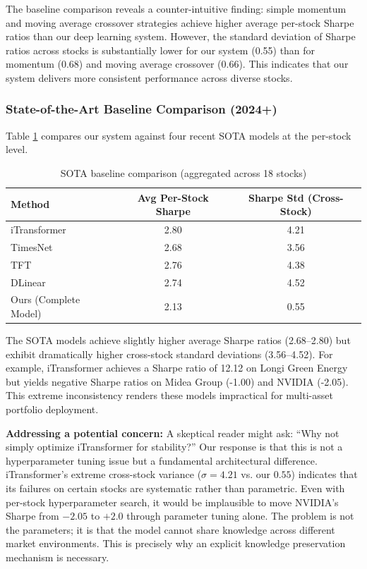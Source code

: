 \documentclass[review]{elsarticle}
\begin{document}
The baseline comparison reveals a counter-intuitive finding: simple momentum and moving average crossover strategies achieve higher average per-stock Sharpe ratios than our deep learning system. However, the standard deviation of Sharpe ratios across stocks is substantially lower for our system (0.55) than for momentum (0.68) and moving average crossover (0.66). This indicates that our system delivers more consistent performance across diverse stocks.

\subsubsection{State-of-the-Art Baseline Comparison (2024+)}

Table \ref{tab:sota} compares our system against four recent SOTA models at the per-stock level.

\begin{table}[t]
\centering
\caption{SOTA baseline comparison (aggregated across 18 stocks)}
\label{tab:sota}
\begin{tabular}{lcc}
\toprule
Method & Avg Per-Stock Sharpe & Sharpe Std (Cross-Stock) \\
\midrule
iTransformer & 2.80 & 4.21 \\
TimesNet & 2.68 & 3.56 \\
TFT & 2.76 & 4.38 \\
DLinear & 2.74 & 4.52 \\
Ours (Complete Model) & 2.13 & 0.55 \\
\bottomrule
\end{tabular}
\end{table}

The SOTA models achieve slightly higher average Sharpe ratios (2.68--2.80) but exhibit dramatically higher cross-stock standard deviations (3.56--4.52). For example, iTransformer achieves a Sharpe ratio of 12.12 on Longi Green Energy but yields negative Sharpe ratios on Midea Group (-1.00) and NVIDIA (-2.05). This extreme inconsistency renders these models impractical for multi-asset portfolio deployment.

\textbf{Addressing a potential concern:} A skeptical reader might ask: ``Why not simply optimize iTransformer for stability?'' Our response is that this is not a hyperparameter tuning issue but a fundamental architectural difference. iTransformer's extreme cross-stock variance ($\sigma=4.21$ vs. our $0.55$) indicates that its failures on certain stocks are systematic rather than parametric. Even with per-stock hyperparameter search, it would be implausible to move NVIDIA's Sharpe from $-2.05$ to $+2.0$ through parameter tuning alone. The problem is not the parameters; it is that the model cannot share knowledge across different market environments. This is precisely why an explicit knowledge preservation mechanism is necessary.
\end{document}
